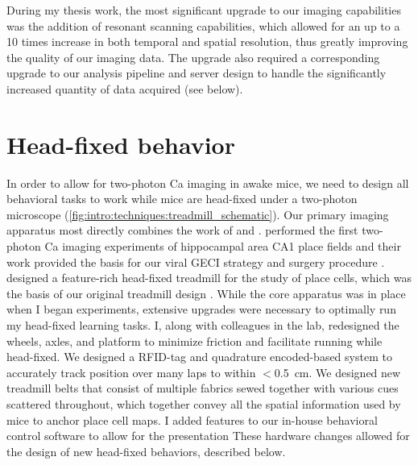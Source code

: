 During my thesis work, the most significant upgrade to our imaging capabilities was the addition of resonant scanning capabilities, which allowed for an up to a 10 times increase in both temporal and spatial resolution, thus greatly improving the quality of our imaging data.
The upgrade also required a corresponding upgrade to our analysis pipeline and server design to handle the significantly increased quantity of data acquired (see below).

\section{Head-fixed behavior}
\label{sec:intro:techniques:behavior}
In order to allow for two-photon Ca imaging in awake mice, we need to design all behavioral tasks to work while mice are head-fixed under a two-photon microscope (\autoref{fig:intro:techniques:treadmill_schematic}).
Our primary imaging apparatus most directly combines the work of \citeauthor{Dombeck2010} and \citeauthor{Royer2012}.
\citeauthor{Dombeck2010} performed the first two-photon Ca imaging experiments of hippocampal area CA1 place fields and their work provided the basis for our viral GECI strategy and surgery procedure \citep{Dombeck2010}.
\citeauthor{Royer2012} designed a feature-rich head-fixed treadmill for the study of place cells, which was the basis of our original treadmill design \citep{Royer2012}.
While the core apparatus was in place when I began experiments, extensive upgrades were necessary to optimally run my head-fixed learning tasks.
I, along with colleagues in the lab, redesigned the wheels, axles, and platform to minimize friction and facilitate running while head-fixed.
We designed a RFID-tag and quadrature encoded-based system to accurately track position over many laps to within $<$0.5~cm.
We designed new treadmill belts that consist of multiple fabrics sewed together with various cues scattered throughout, which together convey all the spatial information used by mice to anchor place cell maps.
I added features to our in-house behavioral control software to allow for the presentation
These hardware changes allowed for the design of new head-fixed behaviors, described below.

